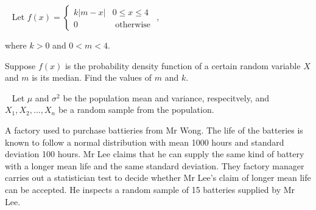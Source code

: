 \documentclass[letterpaper,10pt,addpoints]{exam}
\begin{document}


\newpage
\begin{questions}
\question[20]~
Let $f(x)=\left\{\begin{array}{cl}k|m-x| & 0 \leq x \leq 4 \\ 0 & \text { otherwise }\end{array}\right.$, 

where $k>0$ and $0<m<4$.

Suppose $f(x)$ is the probability density function of a certain random variable $X$ and $m$ is its median. Find the values of $m$ and $k$.


\question[]~
Let $\mu$ and $\sigma^2$ be the population mean and variance, respecitvely, and $X_1,X_2,...,X_n$ be a random sample from the population. 


\question
A factory used to purchase battieries from $\mathrm{Mr}$ Wong. The life of the batteries is known to follow a normal distribution with mean 1000 hours and standard deviation 100 hours. Mr Lee claims that he can supply the same kind of battery with a longer mean life and the same standard deviation. They factory manager carries out a statistician test to decide whether Mr Lee's claim of longer mean life can be accepted. He inspects a random sample of 15 batteries supplied by Mr Lee.
\end{questions}
\end{document}
